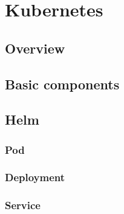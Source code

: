 \section{Kubernetes}

\subsection{Overview}

\subsection{Basic components}

\subsection{Helm}

\subsubsection{Pod}

\subsubsection{Deployment}

\subsubsection{Service}


